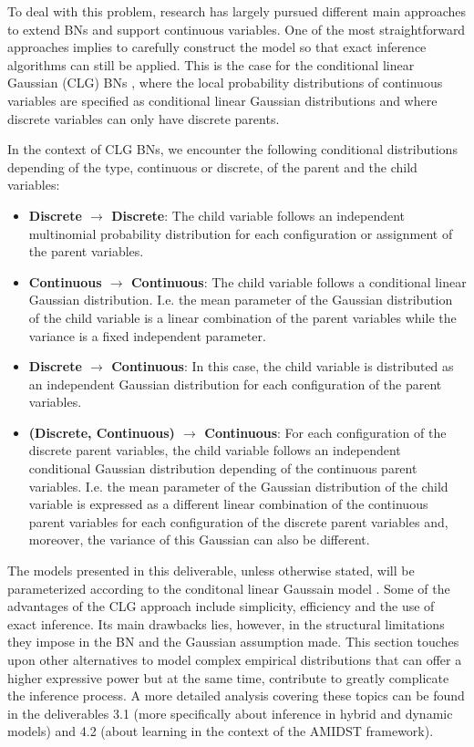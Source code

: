 To deal with this problem, research has largely pursued different main approaches to extend BNs and support continuous variables. One of the most straightforward approaches implies to carefully construct the model so that exact inference algorithms can still be applied. This is the case for the conditional linear Gaussian (CLG) BNs \cite{Lauritzen1992,LauritzenJensen2001}, where the local probability distributions of continuous variables are specified as conditional linear Gaussian distributions and where discrete variables can only have discrete parents. 

In the context of CLG BNs, we encounter the following conditional distributions depending of the type, continuous or discrete, of the parent and the child variables:

\begin{itemize}
\item \textbf{Discrete $\rightarrow$ Discrete}: The child variable follows an independent multinomial probability distribution for each configuration or assignment of the parent variables.

\item \textbf{Continuous $\rightarrow$ Continuous}: The child variable follows a conditional linear Gaussian distribution. I.e. the mean parameter of the Gaussian distribution of the child variable is a linear combination of the parent variables while the variance is a fixed independent parameter. 

\item \textbf{Discrete $\rightarrow$ Continuous}: In this case, the child variable is distributed as an independent Gaussian distribution for each configuration of the parent variables. 

\item \textbf{ (Discrete, Continuous) $\rightarrow$ Continuous}:  For each configuration of the discrete parent variables, the child variable follows an independent conditional Gaussian distribution depending of the continuous parent variables. I.e. the mean parameter of the Gaussian distribution of the child variable is expressed as a different linear combination of the continuous parent variables for each configuration of the discrete parent variables and, moreover, the variance of this Gaussian can also be different. 

\end{itemize}


The models presented in this deliverable, unless otherwise stated, will be parameterized according to the conditonal linear Gaussain model \cite{Lauritzen1992,LauritzenJensen2001}. Some of the advantages of the CLG approach include simplicity, efficiency and the use of exact inference. Its main drawbacks lies, however, in the structural limitations they impose in the BN and the Gaussian assumption made. This section touches upon other alternatives to model complex empirical distributions that can offer a higher expressive power but at the same time, contribute to greatly complicate the inference process. A more detailed analysis covering these topics can be found in the deliverables 3.1 (more specifically about inference in hybrid and dynamic models) and 4.2 (about learning in the context of the AMIDST framework).
 

